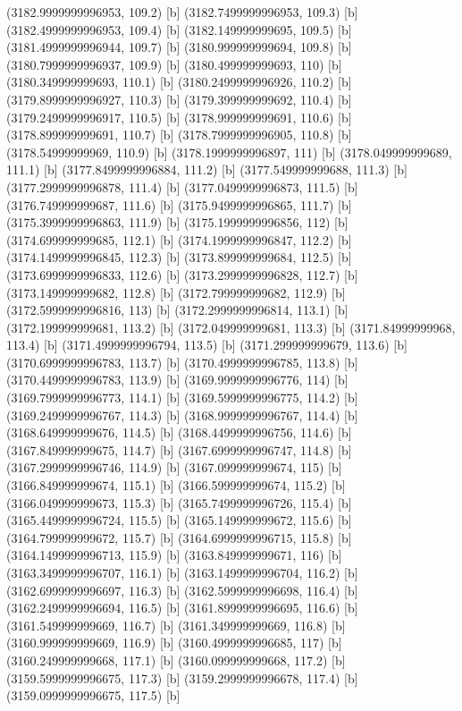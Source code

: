{{{(3182.9999999996953, 109.2) [b] 
(3182.7499999996953, 109.3) [b] 
(3182.4999999996953, 109.4) [b] 
(3182.149999999695, 109.5) [b] 
(3181.4999999996944, 109.7) [b] 
(3180.999999999694, 109.8) [b] 
(3180.7999999996937, 109.9) [b] 
(3180.499999999693, 110) [b] 
(3180.349999999693, 110.1) [b] 
(3180.2499999996926, 110.2) [b] 
(3179.8999999996927, 110.3) [b] 
(3179.399999999692, 110.4) [b] 
(3179.2499999996917, 110.5) [b] 
(3178.999999999691, 110.6) [b] 
(3178.899999999691, 110.7) [b] 
(3178.7999999996905, 110.8) [b] 
(3178.54999999969, 110.9) [b] 
(3178.1999999996897, 111) [b] 
(3178.049999999689, 111.1) [b] 
(3177.8499999996884, 111.2) [b] 
(3177.549999999688, 111.3) [b] 
(3177.2999999996878, 111.4) [b] 
(3177.0499999996873, 111.5) [b] 
(3176.749999999687, 111.6) [b] 
(3175.9499999996865, 111.7) [b] 
(3175.3999999996863, 111.9) [b] 
(3175.1999999996856, 112) [b] 
(3174.699999999685, 112.1) [b] 
(3174.1999999996847, 112.2) [b] 
(3174.1499999996845, 112.3) [b] 
(3173.899999999684, 112.5) [b] 
(3173.6999999996833, 112.6) [b] 
(3173.2999999996828, 112.7) [b] 
(3173.149999999682, 112.8) [b] 
(3172.799999999682, 112.9) [b] 
(3172.5999999996816, 113) [b] 
(3172.2999999996814, 113.1) [b] 
(3172.199999999681, 113.2) [b] 
(3172.049999999681, 113.3) [b] 
(3171.84999999968, 113.4) [b] 
(3171.4999999996794, 113.5) [b] 
(3171.299999999679, 113.6) [b] 
(3170.6999999996783, 113.7) [b] 
(3170.4999999996785, 113.8) [b] 
(3170.4499999996783, 113.9) [b] 
(3169.9999999996776, 114) [b] 
(3169.7999999996773, 114.1) [b] 
(3169.5999999996775, 114.2) [b] 
(3169.2499999996767, 114.3) [b] 
(3168.9999999996767, 114.4) [b] 
(3168.649999999676, 114.5) [b] 
(3168.4499999996756, 114.6) [b] 
(3167.849999999675, 114.7) [b] 
(3167.6999999996747, 114.8) [b] 
(3167.2999999996746, 114.9) [b] 
(3167.099999999674, 115) [b] 
(3166.849999999674, 115.1) [b] 
(3166.599999999674, 115.2) [b] 
(3166.049999999673, 115.3) [b] 
(3165.7499999996726, 115.4) [b] 
(3165.4499999996724, 115.5) [b] 
(3165.149999999672, 115.6) [b] 
(3164.799999999672, 115.7) [b] 
(3164.6999999996715, 115.8) [b] 
(3164.1499999996713, 115.9) [b] 
(3163.849999999671, 116) [b] 
(3163.3499999996707, 116.1) [b] 
(3163.1499999996704, 116.2) [b] 
(3162.6999999996697, 116.3) [b] 
(3162.5999999996698, 116.4) [b] 
(3162.2499999996694, 116.5) [b] 
(3161.8999999996695, 116.6) [b] 
(3161.549999999669, 116.7) [b] 
(3161.349999999669, 116.8) [b] 
(3160.999999999669, 116.9) [b] 
(3160.4999999996685, 117) [b] 
(3160.249999999668, 117.1) [b] 
(3160.099999999668, 117.2) [b] 
(3159.5999999996675, 117.3) [b] 
(3159.2999999996678, 117.4) [b] 
(3159.0999999996675, 117.5) [b] 
}}}
